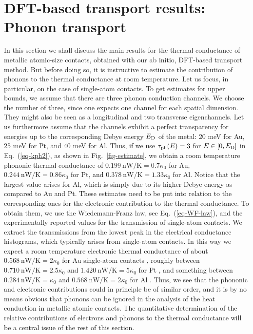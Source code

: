 \documentclass[aps,amsmath,amssymb,twocolumn,showpacs]{revtex4-1}
\begin{document}
\section{DFT-based transport results: Phonon transport} \label{sec-DFT-results}

In this section we shall discuss the main results for the thermal conductance
of metallic atomic-size contacts, obtained with our ab initio, DFT-based
transport method. But before doing so, it is instructive to estimate the
contribution of phonons to the thermal conductance at room temperature. Let us
focus, in particular, on the case of single-atom contacts. To get estimates
for upper bounds, we assume that there are three phonon conduction
channels. We choose the number of three, since one expects one channel for
each spatial dimension. They might also be seen as a longitudinal and two
transverse eigenchannels. Let us furthermore assume that the channels exhibit
a perfect transparency for energies up to the corresponding Debye energy
$E_{\rm D}$ of the metal: 20 meV for Au, 25 meV for Pt, and 40 meV for
Al. Thus, if we use $\tau_{\rm ph}(E) = 3$ for $E \in [0, E_{\rm D}]$ in
Eq.~(\ref{eq-kph2}), as shown in Fig.~\ref{fig-estimate}, we obtain a room
temperature phononic thermal conductance of $0.199~\text{nW/K}=0.7 \kappa_0$
for Au, $0.244~\text{nW/K}=0.86 \kappa_0$ for Pt, and
$0.378~\text{nW/K}=1.33\kappa_0$ for Al. Notice that the largest value arises
for Al, which is simply due to its higher Debye energy as compared to Au and
Pt. These estimates need to be put into relation to the corresponding ones for
the electronic contribution to the thermal conductance. To obtain them, we use
the Wiedemann-Franz law, see Eq.~(\ref{eq-WF-law}), and the experimentally
reported values for the transmission of single-atom
contacts. We extract the transmissions from the lowest peak in
the electrical conductance histograms, which typically arises from
 single-atom contacts. In this way we expect a room temperature electronic
thermal conductance of about $0.568~\text{nW/K}=2\kappa_0$ for Au single-atom
contacts \cite{Agrait2003}, roughly between $0.710~\text{nW/K}=2.5\kappa_0$
and $1.420~\text{nW/K}=5\kappa_0$ for Pt
\cite{Nielsen2003,Smit2003,Evangeli2015}, and something between
$0.284~\text{nW/K}=\kappa_0$ and $0.568~\text{nW/K}=2\kappa_0$ for Al
\cite{Yanson1997,Cuevas1998b}. Thus, we see that the phononic and electronic
contributions could in principle be of similar order, and it is by no means
obvious that phonons can be ignored in the analysis of the heat conduction in
metallic atomic contacts. The quantitative determination of the relative
contributions of electrons and phonons to the thermal conductance will be a
central issue of the rest of this section.
\end{document}
